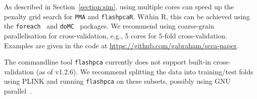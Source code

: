 \documentclass[a4paper,10pt]{article}
\begin{document}
As described in Section~\ref{section:sim}, using multiple
cores can speed up the penalty grid search for \texttt{PMA} and
\texttt{flashpcaR}. Within \textsf{R}, this can be achieved using the
\texttt{foreach}~\citep{foreach} and \texttt{doMC}~\citep{doMC} packages. We
recommend using coarse-grain parallelisation for cross-validation, e.g.,
5 cores for 5-fold cross-validation. Examples are given in the code at
\url{https://github.com/gabraham/scca-paper}.

The commandline tool \texttt{flashpca} currently does not support built-in
cross-validation (as of v1.2.6). We recommend splitting the data into
training/test folds using PLINK and running \texttt{flashpca} on these subsets,
possibly using GNU parallel~\citep{Tange2011a}.





\end{document}
